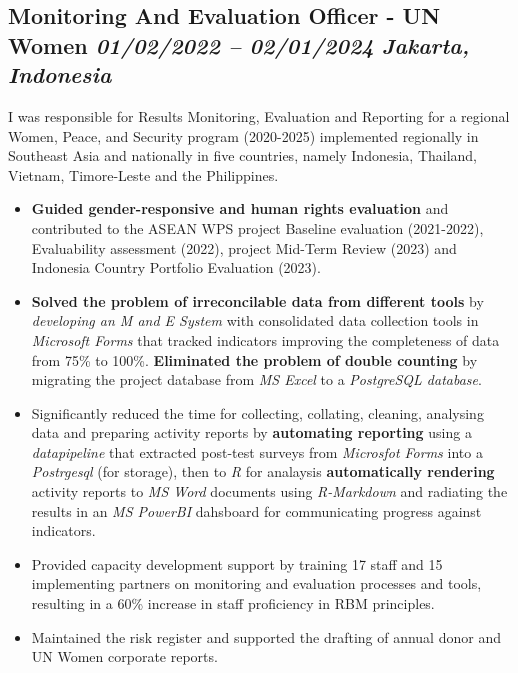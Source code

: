 \documentclass[
  10pt,
]{article}
\providecommand{\tightlist}{%
  \setlength{\itemsep}{0pt}\setlength{\parskip}{0pt}}
\begin{document}
\subsection{\texorpdfstring{Monitoring And Evaluation Officer - UN Women
\emph{01/02/2022 -- 02/01/2024} \textbar{} \emph{Jakarta, Indonesia}}{Monitoring And Evaluation Officer - UN Women 01/02/2022 -- 02/01/2024 \textbar{} Jakarta, Indonesia}}\label{monitoring-and-evaluation-officer---un-women-01022022-02012024-jakarta-indonesia}

I was responsible for Results Monitoring, Evaluation and Reporting for a regional Women, Peace, and Security program (2020-2025) implemented regionally in Southeast Asia and nationally in five countries, namely Indonesia, Thailand, Vietnam, Timore-Leste and the Philippines.

\begin{itemize}
\tightlist
\item
\textbf{Guided gender-responsive and human rights evaluation} and contributed to the ASEAN WPS project Baseline evaluation (2021-2022), Evaluability assessment (2022), project Mid-Term Review (2023) and Indonesia Country Portfolio Evaluation (2023).
\item
\textbf{Solved the problem of irreconcilable data from different tools} by \emph{developing an M and E System} with consolidated data collection tools in \emph{Microsoft Forms} that tracked indicators improving the completeness of data from 75\% to 100\%. \textbf{Eliminated the problem of double counting} by migrating the project database from \emph{MS Excel} to a \emph{PostgreSQL database}.
\item
Significantly reduced the time for collecting, collating, cleaning, analysing data and preparing activity reports by \textbf{automating reporting} using a \emph{datapipeline} that extracted post-test surveys from \emph{Microsfot Forms} into a \emph{Postrgesql} (for storage), then to \emph{R} for analaysis \textbf{automatically rendering} activity reports to \emph{MS Word} documents using \emph{R-Markdown} and radiating the results in an \emph{MS PowerBI} dahsboard for communicating progress against indicators.
\item
Provided capacity development support by training 17 staff and 15 implementing partners on monitoring and evaluation processes and tools, resulting in a 60\% increase in staff proficiency in RBM principles.
\item
Maintained the risk register and supported the drafting of annual donor and UN Women corporate reports.
\end{itemize}
\end{document}
